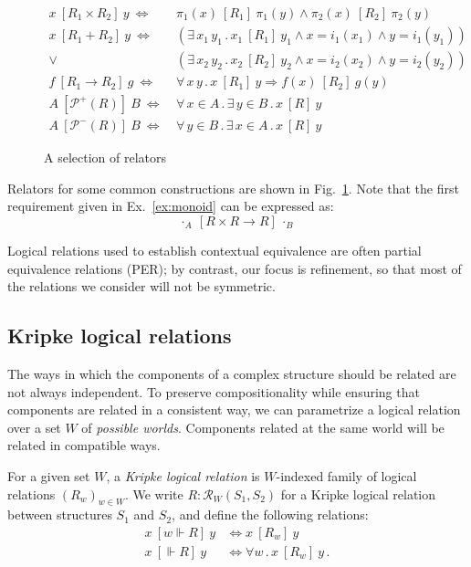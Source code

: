 \documentclass[acmsmall,timestamp,review]{acmart}
\newcommand{\ifr}[1]{\ [{#1}]\ }
\begin{document}
\begin{figure} %
  {\small
  \begin{align*}
    x \ifr{R_1 \times R_2} y \ \Leftrightarrow\  &
      \pi_1(x) \ifr{R_1} \pi_1(y) \wedge
      \pi_2(x) \ifr{R_2} \pi_2(y) \\
    x \ifr{R_1 + R_2} y \ \Leftrightarrow\  &
      (\exists \, x_1 \, y_1 \,.\,
        x_1 \ifr{R_1} y_1 \wedge
        x = i_1(x_1) \wedge
        y = i_1(y_1)) \\ \vee\ &
      (\exists \, x_2 \, y_2 \,.\,
        x_2 \ifr{R_2} y_2 \wedge
        x = i_2(x_2) \wedge
        y = i_2(y_2)) \\
    f \ifr{R_1 \rightarrow R_2} g \ \Leftrightarrow\  &
      \forall \, x \, y \,.\,
        x \ifr{R_1} y \Rightarrow
        f(x) \ifr{R_2} g(y) \\
    A \ifr{\mathcal{P}^+(R)} B \ \Leftrightarrow\  &
      \forall \, x \in A \,.\,
      \exists \, y \in B \,.\,
      x \ifr{R} y \\
    A \ifr{\mathcal{P}^-(R)} B \ \Leftrightarrow\  &
      \forall \, y \in B \,.\,
      \exists \, x \in A \,.\,
      x \ifr{R} y
  \end{align*}
  }%
  \caption{A selection of relators}
  \label{fig:relators}
\end{figure}

Relators for some common constructions are shown in Fig.~\ref{fig:relators}.
Note that the first requirement given in Ex.~\ref{ex:monoid}
can be expressed as:
\[
  \cdot_A \ifr{R \times R \rightarrow R} \cdot_B
\]

Logical relations used to establish contextual equivalence
are often partial equivalence relations (PER);
by contrast, our focus is refinement,
so that most of the relations we consider will not be symmetric.

\subsection{Kripke logical relations} %
\label{sec:klr}

The ways in which the components of a complex structure should be related
are not always independent.
To preserve compositionality while ensuring that
components are related in a consistent way,
we can parametrize a logical relation
over a set $W$ of \emph{possible worlds}.
Components related at the same world will be related
in compatible ways.

\begin{definition}
For a given set $W$,
a \emph{Kripke logical relation} is
$W$-indexed family of logical relations $(R_w)_{w \in W}$.
We write $R : \mathcal{R}_W(S_1, S_2)$
for a Kripke logical relation between structures $S_1$ and $S_2$,
and define the following relations:
\begin{align*}
  x \ifr{w \Vdash R} y &\Leftrightarrow x \ifr{R_w} y \\
  x \ifr{\Vdash R} y &\Leftrightarrow \forall w \,.\, x \ifr{R_w} y \,.
\end{align*}
\end{definition}
\end{document}
